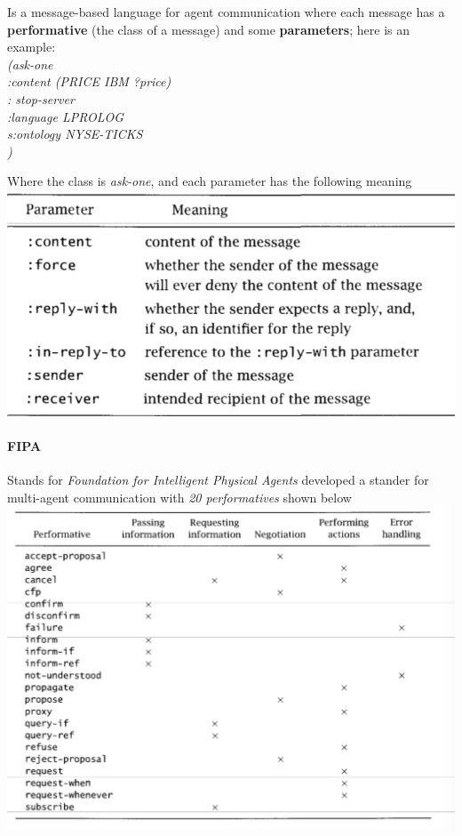 \documentclass[10pt,a4paper]{article}
\begin{document}
Is a message-based language for agent communication where each message has a \textbf{performative} (the class of a message) and some \textbf{parameters}; here is an example:
\textit{
\\(ask-one\\
	:content (PRICE IBM ?price)\\
	: stop-server\\
	:language LPROLOG\\
	s:ontology NYSE-TICKS\\
)\\
}

Where the class is \textit{ask-one}, and each parameter has the following meaning
\includegraphics[scale=0.5]{images/KQML_params.png}

\paragraph{FIPA}
Stands for \textit{Foundation for Intelligent Physical Agents} developed a stander for multi-agent communication with \textit{20 performatives} shown below\\
\includegraphics[scale=0.5]{images/KQML_performatives.png}\\
\end{document}
